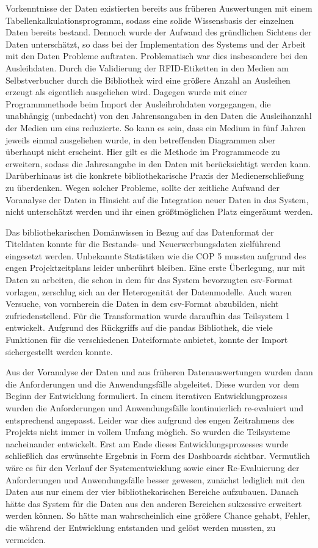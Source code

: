 Vorkenntnisse der Daten existierten bereits aus früheren Auswertungen mit einem Tabellenkalkulationsprogramm, sodass eine solide Wissensbasis 
der einzelnen Daten bereits bestand. Dennoch wurde der Aufwand des gründlichen Sichtens der Daten unterschätzt, so dass bei 
der Implementation des Systems und der Arbeit mit den Daten Probleme auftraten. 
Problematisch war dies insbesondere bei den Ausleihdaten. Durch die Validierung der RFID-Etiketten in
den Medien am Selbstverbucher durch die Bibliothek wird eine größere Anzahl an Ausleihen erzeugt als eigentlich ausgeliehen wird. 
Dagegen wurde mit einer Programmmethode beim Import der Ausleihrohdaten vorgegangen, die unabhängig (unbedacht) von den Jahrensangaben in den Daten die Ausleihanzahl der Medien um eins reduzierte. 
So kann es sein, dass ein Medium in fünf Jahren jeweils einmal ausgeliehen wurde, in den betreffenden Diagrammen aber überhaupt nicht erscheint. 
Hier gilt es die Methode im Programmcode zu erweitern, sodass die Jahresangabe in den Daten mit berücksichtigt werden kann. Darüberhinaus ist die konkrete bibliothekarische Praxis der Medienerschließung zu überdenken.
Wegen solcher Probleme, sollte der zeitliche Aufwand der Voranalyse der Daten in Hinsicht auf die Integration neuer
Daten in das System, nicht unterschätzt werden und ihr einen größtmöglichen Platz eingeräumt werden. 

Das bibliothekarischen Domänwissen in Bezug auf das Datenformat der Titeldaten konnte
für die Bestands- und Neuerwerbungsdaten zielführend eingesetzt werden. Unbekannte Statistiken wie die \acrlong{COP 5} mussten aufgrund des engen Projektzeitplans leider unberührt bleiben.
Eine erste Überlegung, nur mit Daten zu arbeiten, die schon in dem für das System bevorzugten csv-Format vorlagen, 
zerschlug sich an der Heterogenität der Datenmodelle. Auch waren Versuche, von vornherein die Daten in dem csv-Format abzubilden, nicht zufriedenstellend.
Für die Transformation wurde daraufhin das Teilsystem 1 entwickelt.
Aufgrund des Rückgriffs auf die pandas Bibliothek, die viele Funktionen für die verschiedenen Dateiformate anbietet, konnte der Import sichergestellt werden konnte.

Aus der Voranalyse der Daten und aus früheren Datenauswertungen wurden dann die Anforderungen und die Anwendungsfälle abgeleitet.
Diese wurden vor dem Beginn der Entwicklung formuliert. In einem iterativen Entwicklungprozess wurden die Anforderungen und Anwendungsfälle kontinuierlich re-evaluiert und 
entsprechend angepasst. Leider war dies aufgrund des engen Zeitrahmens des Projekts nicht immer in vollem Umfang möglich. So wurden die Teilsysteme nacheinander entwickelt. 
Erst am Ende dieses Entwicklungsprozesses wurde schließlich das erwünschte Ergebnis in Form des Dashboards sichtbar. Vermutlich wäre es für den Verlauf der Systementwicklung sowie einer
Re-Evaluierung der Anforderungen und Anwendungsfälle besser gewesen, zunächst lediglich mit den Daten aus nur einem der vier bibliothekarischen Bereiche
aufzubauen. Danach hätte das System für die Daten aus den anderen Bereichen sukzessive erweitert werden können. 
So hätte man wahrscheinlich eine größere Chance gehabt, Fehler, die während der Entwicklung entstanden und gelöst werden mussten, zu vermeiden.

